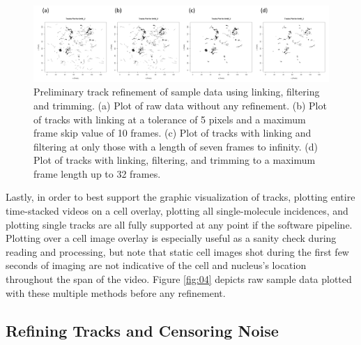 \documentclass{bioinfo}
\begin{document}
\begin{figure}[!tpb]
\centerline{\includegraphics[width=185mm]{refine.png}}
\caption{Preliminary track refinement of sample data using linking, filtering and trimming. (a) Plot of raw data without any refinement. (b) Plot of tracks with linking at a tolerance of 5 pixels and a maximum frame skip value of 10 frames. (c) Plot of tracks with linking and filtering at only those with a length of seven frames to infinity. (d) Plot of tracks with linking, filtering, and trimming to a maximum frame length up to 32 frames.}\label{fig:05}
\end{figure}

Lastly, in order to best support the graphic visualization of tracks, plotting entire time-stacked videos on a cell overlay, plotting all single-molecule incidences, and plotting single tracks are all fully supported at any point if the software pipeline. Plotting over a cell image overlay is especially useful as a sanity check during reading and processing, but note that static cell images shot during the first few seconds of imaging are not indicative of the cell and nucleus's location throughout the span of the video. Figure \ref{fig:04} depicts raw sample data plotted with these multiple methods before any refinement.

\subsection{Refining Tracks and Censoring Noise}
\end{document}

